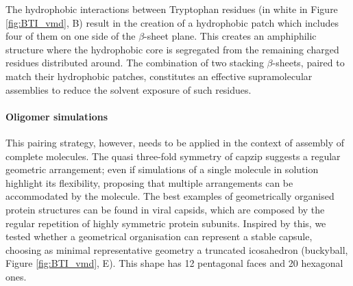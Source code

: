 The hydrophobic interactions between Tryptophan residues (in white in Figure \ref{fig:BTI_vmd}, B) result in the creation of a hydrophobic patch which includes four of them on one side of the $\beta$-sheet plane.
%
This creates an amphiphilic structure where the hydrophobic core is segregated from the remaining charged residues distributed around.
%
The combination of two stacking $\beta$-sheets, paired to match their hydrophobic patches, constitutes an effective supramolecular assemblies to reduce the solvent exposure of such residues.

\paragraph{Oligomer simulations} This pairing strategy, however, needs to be applied in the context of assembly of complete molecules.
%
The quasi three-fold symmetry of capzip suggests a regular geometric arrangement; even if simulations of a single molecule in solution highlight its flexibility, proposing that multiple arrangements can be accommodated by the molecule.
%
The best examples of geometrically organised protein structures can be found in viral capsids, which are composed by the regular repetition of highly symmetric protein subunits.
%
Inspired by this, we tested whether a geometrical organisation can represent a stable capsule, choosing as minimal representative geometry a truncated icosahedron (buckyball, Figure \ref{fig:BTI_vmd}, E). This shape has 12 pentagonal faces and 20 hexagonal ones.

